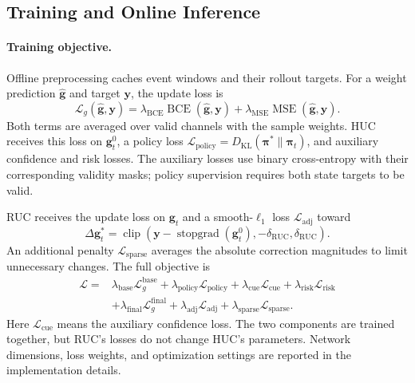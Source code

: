 \documentclass[a4paper,fleqn]{cas-sc}
\newcommand{\gbase}{\bm{g}_t^{0}}
\newcommand{\gfinal}{\bm{g}_t}
\begin{document}
\subsection{Training and Online Inference}
\paragraph{Training objective.}
Offline preprocessing caches event windows and their rollout targets. For a weight prediction $\hat{\bm{g}}$ and target $\bm{y}$, the update loss is
\begin{equation}
\mathcal{L}_g(\hat{\bm{g}},\bm{y})=
\lambda_{\mathrm{BCE}}\operatorname{BCE}(\hat{\bm{g}},\bm{y})
+\lambda_{\mathrm{MSE}}\operatorname{MSE}(\hat{\bm{g}},\bm{y}).
\label{eq:gate_loss}
\end{equation}
Both terms are averaged over valid channels with the sample weights. HUC receives this loss on $\gbase$, a policy loss $\mathcal{L}_{\mathrm{policy}}=D_{\mathrm{KL}}(\bm{\pi}^*\|\bm{\pi}_t)$, and auxiliary confidence and risk losses. The auxiliary losses use binary cross-entropy with their corresponding validity masks; policy supervision requires both state targets to be valid.

RUC receives the update loss on $\gfinal$ and a smooth-$\ell_1$ loss $\mathcal{L}_{\mathrm{adj}}$ toward
\begin{equation}
\Delta\bm{g}_t^*=
\operatorname{clip}\!\left(
\bm{y}-\operatorname{stopgrad}(\gbase),
-\delta_{\mathrm{RUC}},\delta_{\mathrm{RUC}}
\right).
\label{eq:adjustment_target}
\end{equation}
An additional penalty $\mathcal{L}_{\mathrm{sparse}}$ averages the absolute correction magnitudes to limit unnecessary changes. The full objective is
\begin{equation}
\begin{split}
\mathcal{L}={}&
\lambda_{\mathrm{base}}\mathcal{L}_g^{\mathrm{base}}
+\lambda_{\mathrm{policy}}\mathcal{L}_{\mathrm{policy}}
+\lambda_{\mathrm{cue}}\mathcal{L}_{\mathrm{cue}}
+\lambda_{\mathrm{risk}}\mathcal{L}_{\mathrm{risk}}\\
&+\lambda_{\mathrm{final}}\mathcal{L}_g^{\mathrm{final}}
+\lambda_{\mathrm{adj}}\mathcal{L}_{\mathrm{adj}}
+\lambda_{\mathrm{sparse}}\mathcal{L}_{\mathrm{sparse}}.
\end{split}
\label{eq:total_loss}
\end{equation}
Here $\mathcal{L}_{\mathrm{cue}}$ means the auxiliary confidence loss. The two components are trained together, but RUC's losses do not change HUC's parameters. Network dimensions, loss weights, and optimization settings are reported in the implementation details.
\end{document}
